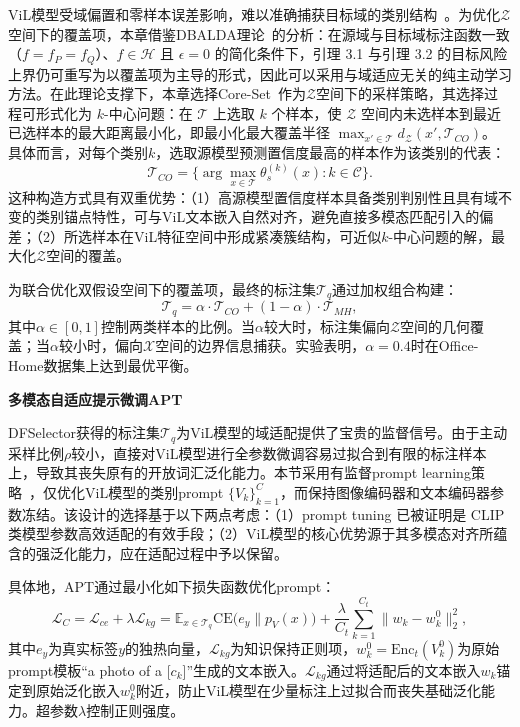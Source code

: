 ViL模型受域偏置和零样本误差影响，难以准确捕获目标域的类别结构~\cite{ge2023domain,tang2024source}。为优化$\mathcal{Z}$空间下的覆盖项，本章借鉴DBALDA理论~\cite{mathelin2022discrepancy}的分析：在源域与目标域标注函数一致（$f=f_P=f_Q$）、$f\in\mathcal{H}$ 且 $\epsilon=0$ 的简化条件下，引理 3.1 与引理 3.2 的目标风险上界仍可重写为以覆盖项为主导的形式，因此可以采用与域适应无关的纯主动学习方法。在此理论支撑下，本章选择Core-Set~\cite{prabhu2021active}作为$\mathcal{Z}$空间下的采样策略，其选择过程可形式化为 $k$-中心问题：在 $\mathcal{T}$ 上选取 $k$ 个样本，使 $\mathcal{Z}$ 空间内未选样本到最近已选样本的最大距离最小化，即最小化最大覆盖半径 $\max_{x'\in\mathcal{T}}d_{\mathcal{Z}}(x',\mathcal{T}_{CO})$。
具体而言，对每个类别$k$，选取源模型预测置信度最高的样本作为该类别的代表：
\begin{equation}
\mathcal{T}_{CO} = \{\arg\max_{x\in\mathcal{T}}\theta_s^{(k)}(x) : k\in\mathcal{C}\}.
\end{equation}
这种构造方式具有双重优势：（1）高源模型置信度样本具备类别判别性且具有域不变的类别锚点特性，可与ViL文本嵌入自然对齐，避免直接多模态匹配引入的偏差；（2）所选样本在ViL特征空间中形成紧凑簇结构，可近似$k$-中心问题的解，最大化$\mathcal{Z}$空间的覆盖。


为联合优化双假设空间下的覆盖项，最终的标注集$\mathcal{T}_q$通过加权组合构建：
\begin{equation}
\mathcal{T}_q = \alpha \cdot \mathcal{T}_{CO} + (1-\alpha)\cdot\mathcal{T}_{MH},
\label{eq:dfselector}
\end{equation}
其中$\alpha\in[0,1]$控制两类样本的比例。当$\alpha$较大时，标注集偏向$\mathcal{Z}$空间的几何覆盖；当$\alpha$较小时，偏向$\mathcal{X}$空间的边界信息捕获。实验表明，$\alpha=0.4$时在Office-Home数据集上达到最优平衡。

\noindent\textbf{多模态自适应提示微调APT}

DFSelector获得的标注集$\mathcal{T}_q$为ViL模型的域适配提供了宝贵的监督信号。由于主动采样比例$\rho$较小，直接对ViL模型进行全参数微调容易过拟合到有限的标注样本上，导致其丧失原有的开放词汇泛化能力。本节采用有监督prompt learning策略~\cite{zhou2022learning}，仅优化ViL模型的类别prompt $\{V_k\}_{k=1}^{C}$，而保持图像编码器和文本编码器参数冻结。该设计的选择基于以下两点考虑：（1）prompt tuning 已被证明是 CLIP 类模型参数高效适配的有效手段；（2）ViL模型的核心优势源于其多模态对齐所蕴含的强泛化能力，应在适配过程中予以保留。

具体地，APT通过最小化如下损失函数优化prompt：
\begin{equation}
\mathcal{L}_C = \mathcal{L}_{ce} + \lambda \mathcal{L}_{kg} = \mathbb{E}_{x\in\mathcal{T}_q}\mathrm{CE}\big(e_y \| p_V(x)\big) + \frac{\lambda}{C_t}\sum_{k=1}^{C_t}\|w_k - w_k^0\|_2^2,
\label{eq:apt_loss}
\end{equation}
其中$e_y$为真实标签$y$的独热向量，$\mathcal{L}_{kg}$为知识保持正则项，$w_k^0=\mathrm{Enc}_t(V_k^0)$为原始prompt模板“a photo of a [$c_k$]”生成的文本嵌入。$\mathcal{L}_{kg}$通过将适配后的文本嵌入$w_k$锚定到原始泛化嵌入$w_k^0$附近，防止ViL模型在少量标注上过拟合而丧失基础泛化能力。超参数$\lambda$控制正则强度。

